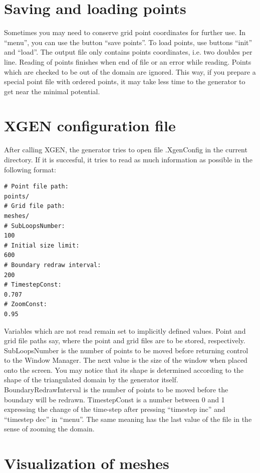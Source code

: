 \documentclass[12pt]{article}
\begin{document}
  \section{Saving and loading points}

  Sometimes you may need to conserve grid point coordinates for
  further use. In ``menu'', you can use the button ``save points''.
  To load points, use buttons ``init'' and ``load''.
  \indent
  The output file only contains points coordinates, i.e. two
  doubles per line. Reading of points finishes when end of file
  or an error while reading. Points which are checked to be
  out of the domain are ignored. This way, if you prepare a 
  special point file with ordered points, it may take less
  time to the generator to get near the minimal potential.  

  \section{XGEN configuration file}
   
  After calling XGEN, the generator tries to open file
  .XgenConfig in the current directory. If it is succesful,
  it tries to read as much information as possible in the
  following format:

  \begin{verbatim} 
# Point file path:
points/
# Grid file path:
meshes/
# SubLoopsNumber:
100
# Initial size limit:
600
# Boundary redraw interval:
200
# TimestepConst:
0.707
# ZoomConst:
0.95
  \end{verbatim}
  Variables which are not read remain set to implicitly defined
  values. Point and grid file paths say, where the point and grid 
  files are to be stored, respectively. SubLoopsNumber is the number of
  points to be moved before returning control to the Window Manager.
  The next value is the size of the window when placed onto the screen.
  You may notice that its shape is determined according to the shape
  of the triangulated domain by the generator itself. BoundaryRedrawInterval
  is the number of points to be moved before the boundary will be
  redrawn. TimestepConst is a number between 0 and 1 expressing the change of
  the time-step after pressing ``timestep inc'' and ``timestep dec'' in ``menu''.
  The same meaning has the last value of the file in the sense of
  zooming the domain.

  \section{Visualization of meshes}
\end{document}
